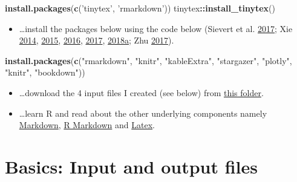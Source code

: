 \documentclass[12pt,]{article}
\newenvironment{Shaded}{\begin{snugshade}}{\end{snugshade}}
\newcommand{\KeywordTok}[1]{\textcolor[rgb]{0.13,0.29,0.53}{\textbf{#1}}}
\newcommand{\StringTok}[1]{\textcolor[rgb]{0.31,0.60,0.02}{#1}}
\newcommand{\OperatorTok}[1]{\textcolor[rgb]{0.81,0.36,0.00}{\textbf{#1}}}
\newcommand{\NormalTok}[1]{#1}
\providecommand{\tightlist}{%
  \setlength{\itemsep}{0pt}\setlength{\parskip}{0pt}}
\theoremstyle{definition}
\theoremstyle{definition}
\theoremstyle{definition}
\theoremstyle{remark}
\begin{document}
\begin{Shaded}
\begin{Highlighting}[]
\KeywordTok{install.packages}\NormalTok{(}\KeywordTok{c}\NormalTok{(}\StringTok{'tinytex'}\NormalTok{, }\StringTok{'rmarkdown'}\NormalTok{))}
\NormalTok{tinytex}\OperatorTok{::}\KeywordTok{install_tinytex}\NormalTok{()}
\end{Highlighting}
\end{Shaded}

\begin{itemize}
\tightlist
\item
  \ldots{}install the packages below using the code below (Sievert et
  al. \protect\hyperlink{ref-plotly}{2017}; Xie
  \protect\hyperlink{ref-knitr3}{2014},
  \protect\hyperlink{ref-knitr2}{2015},
  \protect\hyperlink{ref-bookdown2}{2016},
  \protect\hyperlink{ref-bookdown1}{2017},
  \protect\hyperlink{ref-knitr1}{2018}\protect\hyperlink{ref-knitr1}{a};
  Zhu \protect\hyperlink{ref-kableextra}{2017}).
\end{itemize}

\begin{Shaded}
\begin{Highlighting}[]
\KeywordTok{install.packages}\NormalTok{(}\KeywordTok{c}\NormalTok{(}\StringTok{"rmarkdown"}\NormalTok{, }\StringTok{"knitr"}\NormalTok{, }\StringTok{"kableExtra"}\NormalTok{,}
                   \StringTok{"stargazer"}\NormalTok{, }\StringTok{"plotly"}\NormalTok{, }\StringTok{"knitr"}\NormalTok{,}
                   \StringTok{"bookdown"}\NormalTok{))}
\end{Highlighting}
\end{Shaded}

\begin{itemize}
\item
  \ldots{}download the 4 input files I created (see below) from
  \href{https://drive.google.com/drive/folders/1zJP3cNPrHN-gj0rcmbHQgg-XA0hqDXdd?usp=sharing}{this
  folder}.
\item
  \ldots{}learn R and read about the other underlying components namely
  \href{https://en.wikipedia.org/wiki/Markdown}{Markdown},
  \href{https://rmarkdown.rstudio.com/lesson-1.html}{R Markdown} and
  \href{https://en.wikipedia.org/wiki/LaTeX}{Latex}.
\end{itemize}

\section{Basics: Input and output
files}\label{basics-input-and-output-files}
\end{document}
